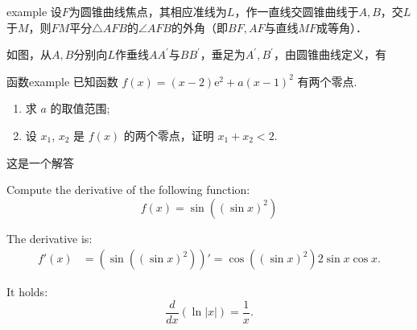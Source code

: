 \documentclass[a4paper,10pt]{ctexbook}
\begin{document}
\begin{property}{}{example}
    设$F$为圆锥曲线焦点，其相应准线为$L$，作一直线交圆锥曲线于$A,B$，交$L$于$M$，则$FM$平分$\triangle AFB$的$\angle AFB$的外角（即$BF,AF$与直线$MF$成等角）．

    如图，从$A,B$分别向$L$作垂线$AA^{\prime}$与$BB^{\prime}$，垂足为$A^{\prime},B^{\prime}$，由圆锥曲线定义，有

\end{property}



\begin{question}{函数}{example}
    已知函数 $ f(x) = (x - 2)\mathrm{e}^{2} + a (x - 1)^{2} $ 有两个零点.
    \begin{enumerate}[label=(\arabic*)]
        \item 求 $ a $ 的取值范围;
        \item 设 $ x_{1} $, $ x_{2} $ 是 $ f(x) $ 的两个零点，证明 $ x_{1} + x_{2} < 2 $.
    \end{enumerate}
    这是一个解答
\end{question}

\tcbstartrecording\relax
\begin{exercise}
    Compute the derivative of the following function:
    \begin{equation*}
        f(x)=\sin((\sin x)^2)
    \end{equation*}

    \tcblower

    The derivative is:
    \begin{align*}
        f'(x) & = \left( \sin((\sin x)^2) \right)'
        =\cos((\sin x)^2) 2\sin x \cos x.
    \end{align*}
\end{exercise}

\begin{exercise}[no solution]
    It holds:
    \begin{equation*}
        \frac{d}{dx}\left(\ln|x|\right) = \frac{1}{x}.
    \end{equation*}
\end{exercise}


\tcbstoprecording

\tcbinputrecords
\end{document}
